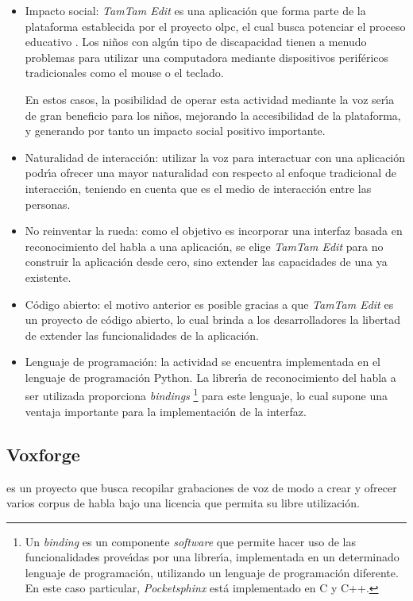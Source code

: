 \begin{itemize}
    \item Impacto social: \emph{TamTam Edit} es una aplicaci\'on que forma parte de la plataforma establecida
    por el proyecto \gls{olpc}, el cual busca potenciar el proceso educativo \cite{OLPC}. 
    Los ni\~nos con alg\'un tipo de discapacidad tienen a menudo problemas para utilizar una computadora mediante
    dispositivos perif\'ericos tradicionales como el mouse o el teclado.

    En estos casos, la posibilidad de operar esta actividad mediante la voz ser{\'\i}a de gran beneficio 
    para los ni\~nos, mejorando la accesibilidad de la plataforma, y generando por tanto un impacto social
    positivo importante.
    \item Naturalidad de interacci\'on: utilizar la voz para interactuar con una aplicaci\'on podr{\'\i}a
    ofrecer una mayor naturalidad con respecto al enfoque tradicional de interacci\'on, teniendo en cuenta
    que es el medio de interacci\'on entre las personas.
    \item No reinventar la rueda: como el objetivo es incorporar una interfaz basada en reconocimiento del
    habla a una aplicaci\'on, se elige \emph{TamTam Edit} para no construir la aplicaci\'on desde cero,
    sino extender las capacidades de una ya existente.
    \item C\'odigo abierto: el motivo anterior es posible gracias a que \emph{TamTam Edit} es un 
    proyecto de c\'odigo abierto, lo cual brinda a los desarrolladores la libertad de extender las 
    funcionalidades de la aplicaci\'on.
    \item Lenguaje de programaci\'on: la actividad se encuentra implementada en el lenguaje de 
    programaci\'on Python. La librer{\'\i}a de reconocimiento del habla a ser utilizada proporciona 
    \emph{bindings} 
    \footnote{Un \emph{binding} es un componente \emph{software}
   que permite hacer uso de las funcionalidades prove{\'\i}das por una librer{\'\i}a, implementada
    en un determinado lenguaje de programaci\'on, utilizando un lenguaje de programaci\'on diferente. 
    En este caso particular, \emph{Pocketsphinx} est\'a implementado en C y C++.} para 
    este lenguaje, lo cual supone una ventaja importante para la implementaci\'on de la interfaz.
\end{itemize}


\subsection{Voxforge}
 es un proyecto que busca recopilar grabaciones de voz de modo a crear 
y ofrecer varios corpus de habla bajo una licencia que permita su libre utilizaci\'on. 

